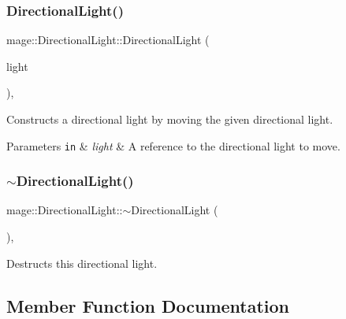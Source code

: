 \subsubsection{\texorpdfstring{Directional\+Light()}{DirectionalLight()}\hspace{0.1cm}{\footnotesize\ttfamily [3/3]}}
{\footnotesize\ttfamily mage\+::\+Directional\+Light\+::\+Directional\+Light (\begin{DoxyParamCaption}\item[{\hyperlink{classmage_1_1_directional_light}{Directional\+Light} \&\&}]{light }\end{DoxyParamCaption})\hspace{0.3cm}{\ttfamily [default]}, {\ttfamily [noexcept]}}

Constructs a directional light by moving the given directional light.


\begin{DoxyParams}[1]{Parameters}
\mbox{\tt in}  & {\em light} & A reference to the directional light to move. \\
\hline
\end{DoxyParams}
\hypertarget{classmage_1_1_directional_light_a967d33c11a1477c01ce4c9720337caeb}{}\label{classmage_1_1_directional_light_a967d33c11a1477c01ce4c9720337caeb} 
\subsubsection{\texorpdfstring{$\sim$\+Directional\+Light()}{~DirectionalLight()}}
{\footnotesize\ttfamily mage\+::\+Directional\+Light\+::$\sim$\+Directional\+Light (\begin{DoxyParamCaption}{ }\end{DoxyParamCaption})\hspace{0.3cm}{\ttfamily [virtual]}, {\ttfamily [default]}}

Destructs this directional light. 

\subsection{Member Function Documentation}
\hypertarget{classmage_1_1_directional_light_a779c49e066215cff9f80ed40048dfc62}{}\label{classmage_1_1_directional_light_a779c49e066215cff9f80ed40048dfc62} 
